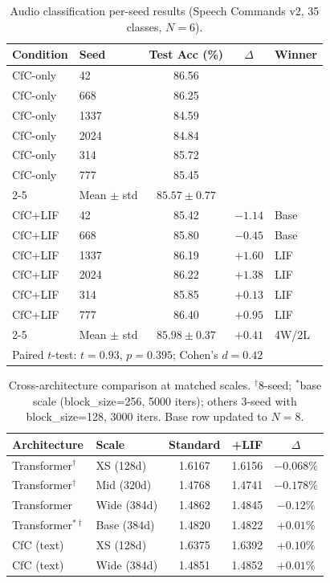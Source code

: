 \documentclass[11pt]{article}
\begin{document}
\begin{table}[h]
\centering
\caption{Audio classification per-seed results (Speech Commands v2, 35 classes, $N = 6$).}
\label{tab:audio-detail}
\begin{tabular}{llccl}
\toprule
\textbf{Condition} & \textbf{Seed} & \textbf{Test Acc (\%)} & \textbf{$\Delta$} & \textbf{Winner} \\
\midrule
CfC-only & 42 & 86.56 & & \\
CfC-only & 668 & 86.25 & & \\
CfC-only & 1337 & 84.59 & & \\
CfC-only & 2024 & 84.84 & & \\
CfC-only & 314 & 85.72 & & \\
CfC-only & 777 & 85.45 & & \\
\cmidrule{2-5}
& Mean $\pm$ std & $85.57 \pm 0.77$ & & \\
\midrule
CfC+LIF & 42 & 85.42 & $-1.14$ & Base \\
CfC+LIF & 668 & 85.80 & $-0.45$ & Base \\
CfC+LIF & 1337 & 86.19 & $+1.60$ & LIF \\
CfC+LIF & 2024 & 86.22 & $+1.38$ & LIF \\
CfC+LIF & 314 & 85.85 & $+0.13$ & LIF \\
CfC+LIF & 777 & 86.40 & $+0.95$ & LIF \\
\cmidrule{2-5}
& Mean $\pm$ std & $85.98 \pm 0.37$ & $+0.41$ & 4W/2L \\
\midrule
\multicolumn{5}{l}{Paired $t$-test: $t = 0.93$, $p = 0.395$; Cohen's $d = 0.42$} \\
\bottomrule
\end{tabular}
\end{table}

\begin{table}[h]
\centering
\caption{Cross-architecture comparison at matched scales. $^\dagger$8-seed; $^*$base scale (block\_size=256, 5000 iters); others 3-seed with block\_size=128, 3000 iters. Base row updated to $N{=}8$.}
\label{tab:cross-arch}
\begin{tabular}{llccc}
\toprule
\textbf{Architecture} & \textbf{Scale} & \textbf{Standard} & \textbf{+LIF} & \textbf{$\Delta$} \\
\midrule
Transformer$^\dagger$ & XS (128d) & 1.6167 & 1.6156 & $-0.068\%$ \\
Transformer$^\dagger$ & Mid (320d) & 1.4768 & 1.4741 & $-0.178\%$ \\
Transformer & Wide (384d) & 1.4862 & 1.4845 & $-0.12\%$ \\
Transformer$^{*\dagger}$ & Base (384d) & 1.4820 & 1.4822 & $+0.01\%$ \\
\midrule
CfC (text) & XS (128d) & 1.6375 & 1.6392 & $+0.10\%$ \\
CfC (text) & Wide (384d) & 1.4851 & 1.4852 & $+0.01\%$ \\
\bottomrule
\end{tabular}
\end{table}
\end{document}
